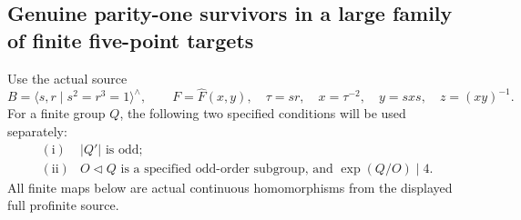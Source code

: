\subsection{Genuine parity-one survivors in a large family of finite five-point targets}

Use the actual source
\[
 B=\langle s,r\mid s^2=r^3=1\rangle^\wedge,\qquad
 F=\widehat F(x,y),\quad
 \tau=sr,\quad x=\tau^{-2},\quad y=sxs,\quad z=(xy)^{-1}.
                                                               \tag{OGS.1}
\]
For a finite group $Q$, the following two specified
conditions will be used separately:
\[
 \begin{array}{ll}
 \mathrm{(i)}& |Q'|\text{ is odd};\\
 \mathrm{(ii)}&
 O\triangleleft Q\text{ is a specified odd-order subgroup,
 and }\exp(Q/O)\mid4 .
 \end{array}                                                    \tag{OGS.2}
\]
All finite maps below are actual continuous homomorphisms
from the displayed full profinite source.


